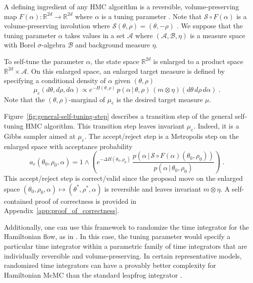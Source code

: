 \documentclass[ejs]{imsart}
\theoremstyle{plain}%
\theoremstyle{remark}
\begin{document}
A defining ingredient of any HMC algorithm is a reversible, volume-preserving map $F(\alpha): \mathbb{R}^{2d} \to \mathbb{R}^{2d}$ where $\alpha$ is a tuning parameter \cite{BoSaActaN2018}.  Note that $\mathcal{S} \circ F(\alpha)$ is a volume-preserving involution where $\mathcal{S}(\theta, \rho) = (\theta, -\rho)$ \cite{ChBaCa2023}.  We suppose that the tuning parameter $\alpha$
takes values in a set $\mathcal{A}$ where $(\mathcal{A}, \mathcal{B}, \eta)$ is a measure space with Borel $\sigma$-algebra $\mathcal{B}$ and background measure $\eta$.

To self-tune the parameter $\alpha$, the state space $\mathbb{R}^{2d}$ is enlarged to a product space $\mathbb{R}^{2d} \times \mathcal{A}$. On this enlarged space, an enlarged target measure is defined by specifying a conditional density of $\alpha$ given $(\theta, \rho)$ \begin{equation} \label{eq:enlarged_target}
\mu_e(d\theta, d\rho, d\alpha) \propto  e^{-H(\theta, \rho)} \, p( \alpha \, | \, \theta, \rho) \, (m \otimes \eta) (d\theta \, d\rho  \, d\alpha) \;.
\end{equation}  Note that the $(\theta, \rho)$-marginal of $\mu_e$ is the desired target measure $\mu$.

Figure~\ref{fig:general-self-tuning-step} describes a transition step of the general self-tuning HMC algorithm. This transition step leaves invariant $\mu_e$.  Indeed, it is a Gibbs sampler aimed at $\mu_e$.  The accept/reject step is a Metropolis step on the enlarged space with acceptance probability \begin{equation} \label{eq:acceptanceprobability}
a_e(\theta_0, \rho_0, \alpha) = 1 \wedge \left(  e^{-\Delta H(\theta_0,\rho_0)} \, \dfrac{p\left(\alpha \, | \, \mathcal{S} \circ F(\alpha)(\theta_0, \rho_0) \right)}{ p \left(\alpha\, | \, \theta_0, \rho_0 \right)} \right) \;.
\end{equation} This accept/reject step is correct/valid since the proposal move on the enlarged space $(\theta_0, \rho_0, \alpha) \mapsto (\theta^*, \rho^*, \alpha)$ is reversible  and leaves invariant $m \otimes \eta$.  A self-contained proof of correctness is provided in Appendix~\ref{app:proof_of_correctness}.


Additionally, one can use this framework to randomize the time integrator for the Hamiltonian flow, as in \cite{BouRabeeMarsden2022,BouRabeeKleppe2023}.  In this case, the tuning parameter would specify a particular time integrator within a parametric family of time integrators that are individually reversible and volume-preserving.  In certain representative models, randomized time integrators can have a provably better complexity for Hamiltonian McMC than the standard leapfrog integrator \cite{shen2019randomized,ErgodicityRMMHYB,Cao_2021_IBC,BouRabeeMarsden2022,BouRabeeSchuh2023B,BouRabeeOberdoerster2023}.  
\end{document}
